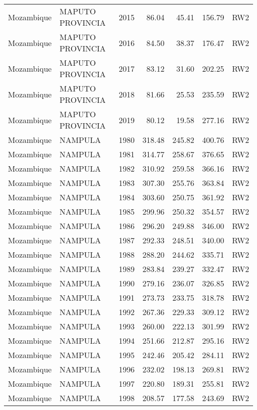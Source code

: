 \begin{longtable}{lllrrrl}
  Mozambique & MAPUTO PROVINCIA & 2015 & 86.04 & 45.41 & 156.79 & RW2 \\ 
  Mozambique & MAPUTO PROVINCIA & 2016 & 84.50 & 38.37 & 176.47 & RW2 \\ 
  Mozambique & MAPUTO PROVINCIA & 2017 & 83.12 & 31.60 & 202.25 & RW2 \\ 
  Mozambique & MAPUTO PROVINCIA & 2018 & 81.66 & 25.53 & 235.59 & RW2 \\ 
  Mozambique & MAPUTO PROVINCIA & 2019 & 80.12 & 19.58 & 277.16 & RW2 \\ 
  Mozambique & NAMPULA & 1980 & 318.48 & 245.82 & 400.76 & RW2 \\ 
  Mozambique & NAMPULA & 1981 & 314.77 & 258.67 & 376.65 & RW2 \\ 
  Mozambique & NAMPULA & 1982 & 310.92 & 259.58 & 366.16 & RW2 \\ 
  Mozambique & NAMPULA & 1983 & 307.30 & 255.76 & 363.84 & RW2 \\ 
  Mozambique & NAMPULA & 1984 & 303.60 & 250.75 & 361.92 & RW2 \\ 
  Mozambique & NAMPULA & 1985 & 299.96 & 250.32 & 354.57 & RW2 \\ 
  Mozambique & NAMPULA & 1986 & 296.20 & 249.88 & 346.00 & RW2 \\ 
  Mozambique & NAMPULA & 1987 & 292.33 & 248.51 & 340.00 & RW2 \\ 
  Mozambique & NAMPULA & 1988 & 288.20 & 244.62 & 335.71 & RW2 \\ 
  Mozambique & NAMPULA & 1989 & 283.84 & 239.27 & 332.47 & RW2 \\ 
  Mozambique & NAMPULA & 1990 & 279.16 & 236.07 & 326.85 & RW2 \\ 
  Mozambique & NAMPULA & 1991 & 273.73 & 233.75 & 318.78 & RW2 \\ 
  Mozambique & NAMPULA & 1992 & 267.36 & 229.33 & 309.12 & RW2 \\ 
  Mozambique & NAMPULA & 1993 & 260.00 & 222.13 & 301.99 & RW2 \\ 
  Mozambique & NAMPULA & 1994 & 251.66 & 212.87 & 295.16 & RW2 \\ 
  Mozambique & NAMPULA & 1995 & 242.46 & 205.42 & 284.11 & RW2 \\ 
  Mozambique & NAMPULA & 1996 & 232.02 & 198.13 & 269.81 & RW2 \\ 
  Mozambique & NAMPULA & 1997 & 220.80 & 189.31 & 255.81 & RW2 \\ 
  Mozambique & NAMPULA & 1998 & 208.57 & 177.58 & 243.69 & RW2 \\ 

\end{longtable}
